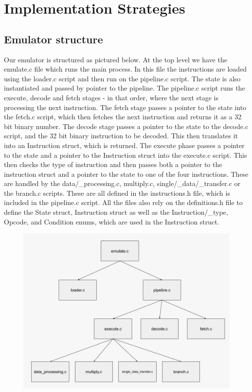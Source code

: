 \documentclass[11pt]{article}
\begin{document}
  \section*{Implementation Strategies}

  \subsection*{Emulator structure}

Our emulator is structured as pictured below. At the top level we have the emulate.c file which runs the main process. In this file the instructions are loaded using the loader.c script and then run on the pipeline.c script. The state is also instantiated and passed by pointer to the pipeline. The pipeline.c script runs the execute, decode and fetch stages - in that order, where the next stage is processing the next instruction. The fetch stage passes a pointer to the state into the fetch.c script, which then fetches the next instruction and returns it as a 32 bit binary number. The decode stage passes a pointer to the state to the decode.c script, and the 32 bit binary instruction to be decoded. This then translates it into an Instruction struct, which is returned. The execute phase passes a pointer to the state and a pointer to the Instruction struct into the execute.c script. This then checks the type of instruction and then passes both a pointer to the instruction struct and a pointer to the state to one of the four instructions. These are handled by the data/_processing.c, multiply.c, single/_data/_transfer.c or the branch.c scripts. These are all defined in the instructions.h file, which is included in the pipeline.c script. All the files also rely on the definitions.h file to define the State struct, Instruction struct as well as the Instruction/_type, Opcode, and Condition enums, which are used in the Instruction struct.

 \begin{figure}[h]
 \includegraphics[scale=0.4]{emulator_structure}
 \centering
 \end{figure}

  
\end{document}
